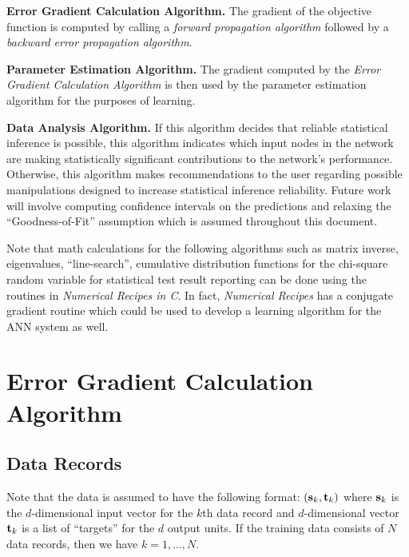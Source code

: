 \documentclass{report}
\begin{document}
\begin{enumerate}

\begin{item}
{\bf Error Gradient Calculation Algorithm.}  The gradient of the
objective function is computed by calling a {\em forward propagation
algorithm} followed by a {\em backward error propagation algorithm}.
\end{item}

\begin{item}
{\bf Parameter Estimation Algorithm.}  The gradient computed by the
{\em Error Gradient Calculation Algorithm} is then used by the
parameter estimation algorithm for the purposes of learning.
\end{item}

\begin{item}
{\bf Data Analysis Algorithm.}  If this algorithm decides that
reliable statistical inference is possible, this algorithm indicates
which input nodes in the network are making statistically significant
contributions to the network's performance.  Otherwise, this algorithm
makes recommendations to the user regarding possible manipulations
designed to increase statistical inference reliability. Future work
will involve computing confidence intervals on the predictions and
relaxing the ``Goodness-of-Fit'' assumption which is assumed
throughout this document.
\end{item}
\end{enumerate}

Note that math calculations for the following algorithms such as
matrix inverse, eigenvalues, ``line-search'', cumulative distribution
functions for the chi-square random variable for statistical test
result reporting can be done using the routines in {\em Numerical
Recipes in C}.  In fact,
{\em Numerical Recipes} has a conjugate gradient routine which could
be used to develop a learning algorithm for the ANN system as well.

\section{Error Gradient Calculation Algorithm}

\subsection{Data Records}
Note that the data is assumed to have the following format: $({\bf
s}_k, {\bf t}_k)$ where ${\bf s}_k$ is the $d$-dimensional input
vector for the $k$th data record and $d$-dimensional vector ${\bf
t}_k$ is a list of ``targets'' for the $d$ output units. If the
training data consists of $N$ data records, then we have $k = 1,
\ldots, N$.
\end{document}
